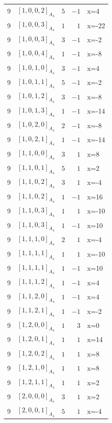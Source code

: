 \documentclass[11pt]{article}
\newcommand{\Dynkin}[1]{#1}
\begin{document}
\begin{longtable}{r l r r l}
9 & $\Dynkin{[1,0,0,2]_{A_4}}$ & $5$ & $-1$ & x=4\\
9 & $\Dynkin{[1,0,0,3]_{A_4}}$ & $1$ & $1$ & x=-22\\
9 & $\Dynkin{[1,0,0,3]_{A_4}}$ & $3$ & $-1$ & x=-2\\
9 & $\Dynkin{[1,0,0,4]_{A_4}}$ & $1$ & $-1$ & x=-8\\
9 & $\Dynkin{[1,0,1,0]_{A_4}}$ & $3$ & $-1$ & x=4\\
9 & $\Dynkin{[1,0,1,1]_{A_4}}$ & $5$ & $-1$ & x=-2\\
9 & $\Dynkin{[1,0,1,2]_{A_4}}$ & $3$ & $-1$ & x=-8\\
9 & $\Dynkin{[1,0,1,3]_{A_4}}$ & $1$ & $-1$ & x=-14\\
9 & $\Dynkin{[1,0,2,0]_{A_4}}$ & $2$ & $-1$ & x=-8\\
9 & $\Dynkin{[1,0,2,1]_{A_4}}$ & $1$ & $-1$ & x=-14\\
9 & $\Dynkin{[1,1,0,0]_{A_4}}$ & $3$ & $1$ & x=8\\
9 & $\Dynkin{[1,1,0,1]_{A_4}}$ & $5$ & $1$ & x=2\\
9 & $\Dynkin{[1,1,0,2]_{A_4}}$ & $3$ & $1$ & x=-4\\
9 & $\Dynkin{[1,1,0,2]_{A_4}}$ & $1$ & $-1$ & x=16\\
9 & $\Dynkin{[1,1,0,3]_{A_4}}$ & $1$ & $1$ & x=-10\\
9 & $\Dynkin{[1,1,0,3]_{A_4}}$ & $1$ & $-1$ & x=10\\
9 & $\Dynkin{[1,1,1,0]_{A_4}}$ & $2$ & $1$ & x=-4\\
9 & $\Dynkin{[1,1,1,1]_{A_4}}$ & $1$ & $1$ & x=-10\\
9 & $\Dynkin{[1,1,1,1]_{A_4}}$ & $1$ & $-1$ & x=10\\
9 & $\Dynkin{[1,1,1,2]_{A_4}}$ & $1$ & $-1$ & x=4\\
9 & $\Dynkin{[1,1,2,0]_{A_4}}$ & $1$ & $-1$ & x=4\\
9 & $\Dynkin{[1,1,2,1]_{A_4}}$ & $1$ & $-1$ & x=-2\\
9 & $\Dynkin{[1,2,0,0]_{A_4}}$ & $1$ & $3$ & x=0\\
9 & $\Dynkin{[1,2,0,1]_{A_4}}$ & $1$ & $1$ & x=14\\
9 & $\Dynkin{[1,2,0,2]_{A_4}}$ & $1$ & $1$ & x=8\\
9 & $\Dynkin{[1,2,1,0]_{A_4}}$ & $1$ & $1$ & x=8\\
9 & $\Dynkin{[1,2,1,1]_{A_4}}$ & $1$ & $1$ & x=2\\
9 & $\Dynkin{[2,0,0,0]_{A_4}}$ & $3$ & $1$ & x=2\\
9 & $\Dynkin{[2,0,0,1]_{A_4}}$ & $5$ & $1$ & x=-4\\

\end{longtable}
\end{document}
